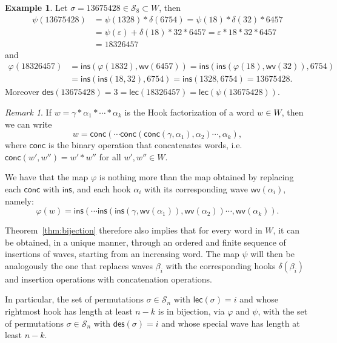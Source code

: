\documentclass[a4paper]{amsart}
\newcommand{\des}{\mathsf{des}}
\newcommand{\lec}{\mathsf{lec}}
\newcommand{\ins}{\mathsf{ins}}
\newcommand{\wv}{\mathsf{wv}}
\newcommand{\conc}{\mathsf{conc}}
\theoremstyle{definition}
\newtheorem{example}[theorem]{Example}
\theoremstyle{remark}
\newtheorem{remark}[theorem]{Remark}
\numberwithin{equation}{section}
\begin{document}
\begin{example}
Let $\sigma=13675428\in \mathcal{S}_8\subset W$, then
\begin{align*}
    \psi(13675428)&=\psi(1328)*\delta(6754)=\psi(18)*\delta(32)*6457\\
    &=\psi(\varepsilon)+\delta(18)*32*6457=\varepsilon*18*32*6457 \\
    &=18326457
\end{align*}
and 
\begin{align*}
    \varphi(18326457)&=\ins(\varphi(1832),\wv(6457))=\ins(\ins(\varphi(18),\wv(32)),6754)\\
    &=\ins(\ins(18,32),6754)=\ins(1328,6754)=13675428.
\end{align*}
Moreover $\des(13675428)=3=\lec(18326457)=\lec(\psi(13675428))$.
\end{example}

\begin{remark}\label{rem:cat_bij}
    If $w=\gamma*\alpha_1*\cdots*\alpha_k$ is the Hook factorization of a word $w\in W$, then we can write
    \begin{equation*}
        w=\conc(\cdots\conc(\conc(\gamma,\alpha_1),\alpha_2)\cdots     ,\alpha_k),
    \end{equation*}
    where $\conc$ is the binary operation that concatenates words, i.e. $\conc(w',w'')=w'*w''$ for all $w',w''\in W$.

We have that the map $\varphi$ is nothing more than the map obtained by replacing each $\conc$ with $\ins$, and each hook $\alpha_i$ with its corresponding wave $\wv(\alpha_i)$, namely:
\begin{equation*}
    \varphi(w)=\ins(\cdots\ins(\ins(\gamma,\wv(\alpha_1)),\wv(\alpha_2))\cdots     ,\wv(\alpha_k)).
    \end{equation*}

Theorem~\ref{thm:bijection} therefore also implies that for every word in $W$, it can be obtained, in a unique manner, through an ordered and finite sequence of insertions of waves, starting from an increasing word. The map $\psi$ will then be analogously the one that replaces waves $\beta_i$ with the corresponding hooks $\delta(\beta_i)$ and insertion operations with concatenation operations.

In particular, the set of permutations $\sigma\in\mathcal{S}_n$ with $\lec(\sigma)=i$ and whose rightmost hook has length at least $n-k$ is in bijection, via $\varphi$ and $\psi$, with the set of permutations $\sigma\in\mathcal{S}_n$ with $\des(\sigma)=i$ and whose special wave has length at least $n-k$. 
\end{remark}
\end{document}

